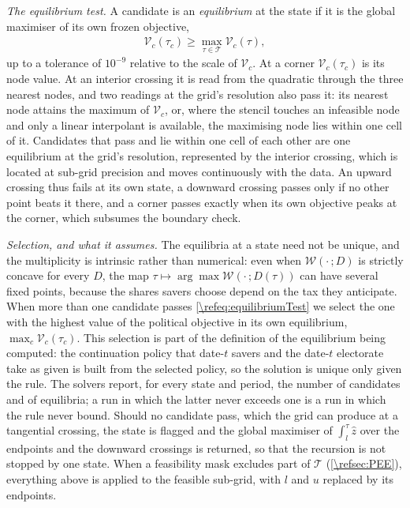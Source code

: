 \emph{The equilibrium test.} A candidate is an \emph{equilibrium} at the state if it is the global maximiser of its own frozen objective,
\begin{align}\label{\refeq:equilibriumTest}
    \mathcal{V}_c(\tau_c) \geq \max_{\tau\in\mathcal{T}}\mathcal{V}_c(\tau),
\end{align}
up to a tolerance of $10^{-9}$ relative to the scale of $\mathcal{V}_c$. At a corner $\mathcal{V}_c(\tau_c)$ is its node value. At an interior crossing it is read from the quadratic through the three nearest nodes, and two readings at the grid's resolution also pass it: its nearest node attains the maximum of $\mathcal{V}_c$, or, where the stencil touches an infeasible node and only a linear interpolant is available, the maximising node lies within one cell of it. Candidates that pass and lie within one cell of each other are one equilibrium at the grid's resolution, represented by the interior crossing, which is located at sub-grid precision and moves continuously with the data. An upward crossing thus fails at its own state, a downward crossing passes only if no other point beats it there, and a corner passes exactly when its own objective peaks at the corner, which subsumes the boundary check.

\emph{Selection, and what it assumes.} The equilibria at a state need not be unique, and the multiplicity is intrinsic rather than numerical: even when $\mathcal{W}(\cdot\,;D)$ is strictly concave for every $D$, the map $\tau\mapsto\arg\max\mathcal{W}(\cdot\,;D(\tau))$ can have several fixed points, because the shares savers choose depend on the tax they anticipate. When more than one candidate passes \eqref{\refeq:equilibriumTest} we select the one with the highest value of the political objective in its own equilibrium, $\max_c \mathcal{V}_c(\tau_c)$. This selection is part of the definition of the equilibrium being computed: the continuation policy that date-$t$ savers and the date-$t$ electorate take as given is built from the selected policy, so the solution is unique only given the rule. The solvers report, for every state and period, the number of candidates and of equilibria; a run in which the latter never exceeds one is a run in which the rule never bound. Should no candidate pass, which the grid can produce at a tangential crossing, the state is flagged and the global maximiser of $\int_l^{\tau}\hat{z}$ over the endpoints and the downward crossings is returned, so that the recursion is not stopped by one state. When a feasibility mask excludes part of $\mathcal{T}$ (\cref{\refsec:PEE}), everything above is applied to the feasible sub-grid, with $l$ and $u$ replaced by its endpoints.

